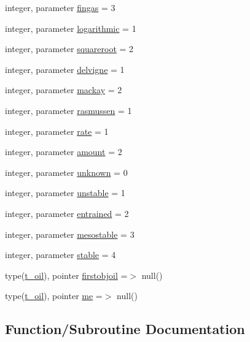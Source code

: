 \begin{DoxyCompactItemize}
integer, parameter \mbox{\hyperlink{namespacemoduleoil__0d_a46a8ff5abb7664d438c259236ce34fa3}{fingas}} = 3
\item 
integer, parameter \mbox{\hyperlink{namespacemoduleoil__0d_a003aee4a4948c37d2a47f050998ef03e}{logarithmic}} = 1
\item 
integer, parameter \mbox{\hyperlink{namespacemoduleoil__0d_aa0be4a9f3a5d952bcd2769af7e6718c2}{squareroot}} = 2
\item 
integer, parameter \mbox{\hyperlink{namespacemoduleoil__0d_a7cef07d2fcba2ee01d6b220d1f0dacb1}{delvigne}} = 1
\item 
integer, parameter \mbox{\hyperlink{namespacemoduleoil__0d_abda97c68a1cb4ffc509c1473edc29b57}{mackay}} = 2
\item 
integer, parameter \mbox{\hyperlink{namespacemoduleoil__0d_aac138a50bfeae5b8770c4da7e6ff7262}{rasmussen}} = 1
\item 
integer, parameter \mbox{\hyperlink{namespacemoduleoil__0d_afc4d36d0c03e5571cd2fae4f01faf46b}{rate}} = 1
\item 
integer, parameter \mbox{\hyperlink{namespacemoduleoil__0d_af633580ca21201c485705f0b999cf21c}{amount}} = 2
\item 
integer, parameter \mbox{\hyperlink{namespacemoduleoil__0d_a094586a193a6fabfe6a9b25eea9c2fb9}{unknown}} = 0
\item 
integer, parameter \mbox{\hyperlink{namespacemoduleoil__0d_a8c7a38b47927f827a11f7650d63c5f7e}{unstable}} = 1
\item 
integer, parameter \mbox{\hyperlink{namespacemoduleoil__0d_ace1af42f0d06c1c6642bcd893ded460c}{entrained}} = 2
\item 
integer, parameter \mbox{\hyperlink{namespacemoduleoil__0d_aef2e8e2ad962beeb6bb5301b5888e0a4}{mesostable}} = 3
\item 
integer, parameter \mbox{\hyperlink{namespacemoduleoil__0d_a9633b81c847d2725723582f29faf373b}{stable}} = 4
\item 
type(\mbox{\hyperlink{structmoduleoil__0d_1_1t__oil}{t\+\_\+oil}}), pointer \mbox{\hyperlink{namespacemoduleoil__0d_ac5073a09d38699166168d1fd88087a70}{firstobjoil}} =$>$ null()
\item 
type(\mbox{\hyperlink{structmoduleoil__0d_1_1t__oil}{t\+\_\+oil}}), pointer \mbox{\hyperlink{namespacemoduleoil__0d_acc4a1700e48af3af5e8087197b74d450}{me}} =$>$ null()
\end{DoxyCompactItemize}


\subsection{Function/\+Subroutine Documentation}
\mbox{\label{namespacemoduleoil__0d_a90135088740373e7de26e5316c979963}} 
